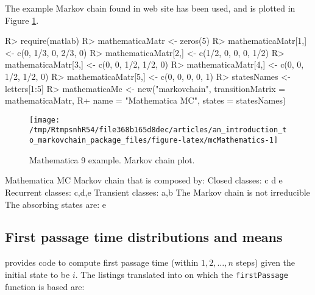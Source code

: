 \documentclass[
  nojss]{jss}
\begin{document}
The example Markov chain found in  web site \citep{mathematica9MarkovChain} has
been used, and is plotted in Figure \ref{fig:mcMathematics}.

\begin{CodeChunk}

\begin{CodeInput}
R> require(matlab)
R> mathematicaMatr <- zeros(5)
R> mathematicaMatr[1,] <- c(0, 1/3, 0, 2/3, 0)
R> mathematicaMatr[2,] <- c(1/2, 0, 0, 0, 1/2)
R> mathematicaMatr[3,] <- c(0, 0, 1/2, 1/2, 0)
R> mathematicaMatr[4,] <- c(0, 0, 1/2, 1/2, 0)
R> mathematicaMatr[5,] <- c(0, 0, 0, 0, 1)
R> statesNames <- letters[1:5]
R> mathematicaMc <- new("markovchain", transitionMatrix = mathematicaMatr,
R+                    name = "Mathematica MC", states = statesNames)
\end{CodeInput}
\end{CodeChunk}

\begin{CodeChunk}
\begin{figure}

{\centering \texttt{[image: /tmp/RtmpsnhR54/file368b165d8dec/articles/an\_introduction\_to\_markovchain\_package\_files/figure-latex/mcMathematics-1]} 

}

\caption[Mathematica 9 example]{Mathematica 9 example. Markov chain plot.}\label{fig:mcMathematics}
\end{figure}
\end{CodeChunk}

\begin{CodeChunk}

\begin{CodeOutput}
Mathematica MC  Markov chain that is composed by: 
Closed classes: 
c d 
e 
Recurrent classes: 
{c,d},{e}
Transient classes: 
{a,b}
The Markov chain is not irreducible 
The absorbing states are: e
\end{CodeOutput}
\end{CodeChunk}

\hypertarget{first-passage-time-distributions-and-means}{%
\subsection{First passage time distributions and means}\label{first-passage-time-distributions-and-means}}

\cite{renaldoMatlab} provides code to compute first passage time (within \(1,2,\ldots, n\) steps) given the initial state to be \(i\). The  listings translated into  on which the \texttt{firstPassage} function is based are:
\end{document}
